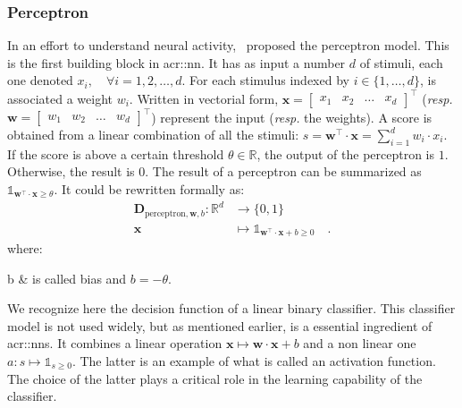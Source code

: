         \subsubsection{Perceptron}
            In an effort to understand neural activity,~\textcite{rosenblatt1958perceptron} proposed the perceptron model.
            This is the first building block in \gls{acr::nn}.
            It has as input a number $d$ of stimuli, each one denoted $x_i,\quad \forall i = 1,2,\dots,d$.
            For each stimulus indexed by $i\in \{1,\dots,d\}$, is associated a weight $w_i$.
            Written in vectorial form, $\bm{x} = \begin{bmatrix}x_1 & x_2 & \hdots  & x_d \end{bmatrix}^\intercal$ (\textit{resp.} $\bm{w} = \begin{bmatrix}w_1 & w_2 & \hdots & w_d \end{bmatrix}^\intercal$) represent the input (\textit{resp.} the weights).
            A score is obtained from a linear combination of all the stimuli: $s = \bm{w}^\intercal \cdot \bm{x} = \sum_{i=1}^{d} w_i \cdot x_i$.
            If the score is above a certain threshold $\theta \in \mathbb{R}$, the output of the perceptron is $1$.
            Otherwise, the result is $0$.
            The result of a perceptron can be summarized as $\mathbb{1}_{\bm{w}^\intercal \cdot \bm{x} \geq \theta}$.
            It could be rewritten formally as:
            \begin{equation}
                \label{eq::perceptron}
                \begin{aligned}
                    \mathbf{D}_{\text{perceptron}, \bm{w}, b}: \mathbb{R}^d &\rightarrow \{0, 1\}\\
                    \bm{x} &\mapsto \mathbb{1}_{\bm{w}^\intercal \cdot \bm{x} + b\geq 0} \quad.
                \end{aligned}
            \end{equation}
            where:
            \begin{conditions}
                b & is called bias and $b = - \theta $.
            \end{conditions}
            We recognize here the decision function of a linear binary classifier.
            This classifier model is not used widely, but as mentioned earlier, is a essential ingredient of \glspl{acr::nn}.
            It combines a linear operation $\bm{x} \mapsto \bm{w} \cdot \bm{x} + b$ and a non linear one $a: s \mapsto \mathbb{1}_{s \geq 0}$.
            The latter is an example of what is called an activation function.
            The choice of the latter plays a critical role in the learning capability of the classifier.
